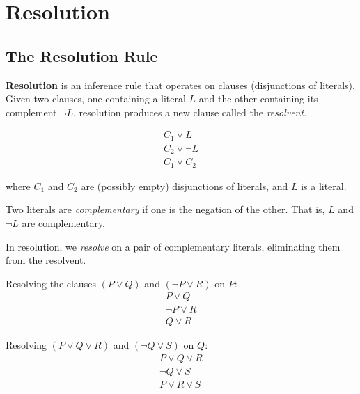 
\section{Resolution}

\subsection{The Resolution Rule}

\begin{definition}[Resolution]
\textbf{Resolution} is an inference rule that operates on clauses (disjunctions
of literals). Given two clauses, one containing a literal $L$ and the other
containing its complement $\neg L$, resolution produces a new clause called the
\emph{resolvent}.

\[
\begin{array}{l}
C_1 \vee L \\
C_2 \vee \neg L \\ \hline
C_1 \vee C_2
\end{array}
\]

where $C_1$ and $C_2$ are (possibly empty) disjunctions of literals, and $L$ is
a literal.
\end{definition}

\begin{definition}
Two literals are \emph{complementary} if one is the negation of the other. That
is, $L$ and $\neg L$ are complementary.

In resolution, we \emph{resolve} on a pair of complementary literals, eliminating
them from the resolvent.
\end{definition}

\begin{example}
Resolving the clauses $(P \vee Q)$ and $(\neg P \vee R)$ on $P$:
\[
\begin{array}{l}
P \vee Q \\
\neg P \vee R \\ \hline
Q \vee R
\end{array}
\]
\end{example}

\begin{example}
Resolving $(P \vee Q \vee R)$ and $(\neg Q \vee S)$ on $Q$:
\[
\begin{array}{l}
P \vee Q \vee R \\
\neg Q \vee S \\ \hline
P \vee R \vee S
\end{array}
\]
\end{example}

